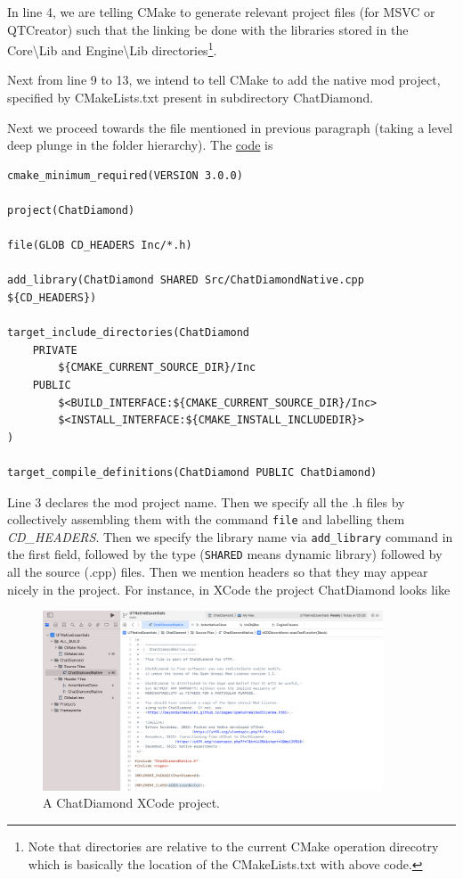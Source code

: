 \documentclass{article}
\theoremstyle{definition}
\newcommand{\FileColor}[1]{{\color{Purple} #1}}
\newcommand{\FolderColor}[1]{{\color{mygray} #1}}
\begin{document}
In line 4, we are telling CMake to generate relevant project files (for MSVC or QTCreator) such that the linking be done with the libraries stored in the \FolderColor{Core\textbackslash Lib} and \FolderColor{Engine\textbackslash Lib} directories\footnote{Note that directories are relative to the current CMake operation direcotry which is basically the location of the \FileColor{CMakeLists.txt} with above code.}.

Next from line 9 to 13, we intend to tell CMake to add the native mod project, specified by \FileColor{CMakeLists.txt} present in subdirectory \FolderColor{ChatDiamond}.

Next we proceed towards the file mentioned in previous paragraph (taking a level deep plunge in the folder hierarchy).  The \href{https://github.com/ravimohan1991/ChatDiamond/blob/f7950b2591b93a54600459ec58d7ddf57fe9218d/UTNativeEssentials/ChatDiamond/CMakeLists.txt}{code} is
\lstset{language=[5.0]Lua}
\begin{lstlisting}[frame=single]
cmake_minimum_required(VERSION 3.0.0)

project(ChatDiamond)

file(GLOB CD_HEADERS Inc/*.h)

add_library(ChatDiamond SHARED Src/ChatDiamondNative.cpp ${CD_HEADERS})

target_include_directories(ChatDiamond
    PRIVATE
        ${CMAKE_CURRENT_SOURCE_DIR}/Inc
    PUBLIC
        $<BUILD_INTERFACE:${CMAKE_CURRENT_SOURCE_DIR}/Inc>
        $<INSTALL_INTERFACE:${CMAKE_INSTALL_INCLUDEDIR}>
)

target_compile_definitions(ChatDiamond PUBLIC ChatDiamond)
\end{lstlisting}

Line 3 declares the mod project name.  Then we specify all the .h files by collectively assembling them with the command \texttt{file} and labelling them \emph{CD\_HEADERS}.  Then we specify the library name via \texttt{add\_library} command in the first field, followed by the type (\texttt{SHARED} means dynamic library) followed by all the source (.cpp) files.  Then we mention headers so that they may appear nicely in the project.  For instance, in XCode the project ChatDiamond looks like
\begin{figure}
\centering
\includegraphics[width=0.9\textwidth]{chatdiamond_xcode}
\caption{A ChatDiamond XCode project.}
\label{fig:chatdiamond_xcode}
\end{figure}
\end{document}
